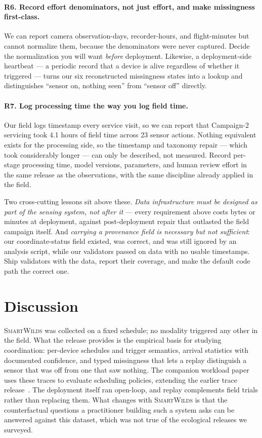 \documentclass[sigconf]{acmart}
\newcommand{\smartwilds}{\textsc{SmartWilds}\xspace}
\begin{document}
\paragraph{R6. Record effort denominators, not just effort, and make
missingness first-class.}
We can report camera observation-days, recorder-hours, and
flight-minutes but cannot normalize them, because the denominators were
never captured. Decide the normalization you will want \emph{before}
deployment. Likewise, a deployment-side heartbeat --- a periodic record
that a device is alive regardless of whether it triggered --- turns our
six reconstructed missingness states into a lookup and distinguishes
``sensor on, nothing seen'' from ``sensor off'' directly.

\paragraph{R7. Log processing time the way you log field time.}
Our field logs timestamp every service visit, so we can report that
Campaign-2 servicing took 4.1 hours of field time across 23 sensor
actions. Nothing equivalent exists for the processing side, so the
timestamp and taxonomy repair --- which took considerably longer --- can
only be described, not measured. Record per-stage processing time, model
versions, parameters, and human review effort in the same release as the
observations, with the same discipline already applied in the field.

Two cross-cutting lessons sit above these. \emph{Data infrastructure
must be designed as part of the sensing system, not after it} --- every
requirement above costs bytes or minutes at deployment, against
post-deployment repair that outlasted the field campaign itself. And \emph{carrying a provenance field is necessary but not
sufficient}: our coordinate-status field existed, was correct, and was
still ignored by an analysis script, while our validators passed on data
with no usable timestamps. Ship validators with the data, report their
coverage, and make the default code path the correct one.

\section{Discussion}
\label{sec:discussion}
\label{sec:using}

\smartwilds was collected on a fixed schedule; no modality triggered any
other in the field. What the release provides is the empirical basis for
studying coordination: per-device schedules and trigger semantics,
arrival statistics with documented confidence, and typed missingness
that lets a replay distinguish a sensor that was off from one that saw
nothing. The companion workload paper~\cite{smartwilds_workload} uses
these traces to evaluate scheduling policies, extending the earlier
trace release~\cite{kline2025smartwilds}. The deployment itself ran
open-loop, and replay complements field trials rather than replacing
them. What changes with \smartwilds is that the counterfactual questions
a practitioner building such a system asks can be answered against this
dataset, which was not true of the ecological releases we surveyed.
\end{document}
